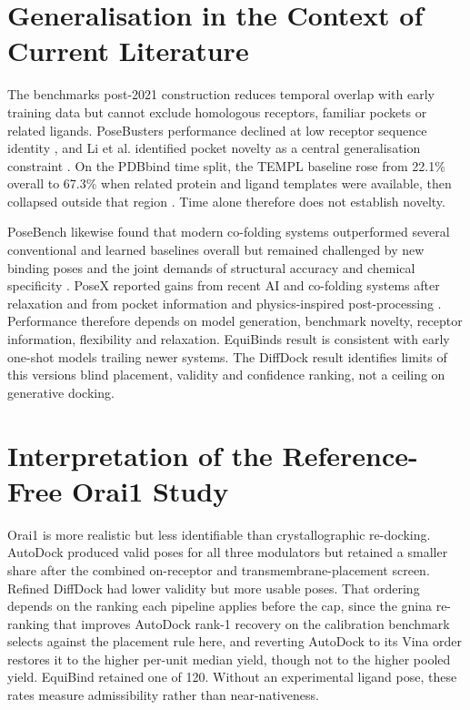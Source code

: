 \hypertarget{generalisation-in-the-context-of-current-literature}{%
\section{Generalisation in the Context of Current Literature}\label{generalisation-in-the-context-of-current-literature}}

The benchmark\textquotesingle s post-2021 construction reduces temporal overlap with early training data but cannot exclude homologous receptors, familiar pockets or related ligands. PoseBusters performance declined at low receptor sequence identity \cite{ref035}, and Li et al. identified pocket novelty as a central generalisation constraint \cite{ref013}. On the PDBbind time split, the TEMPL baseline rose from 22.1\% overall to 67.3\% when related protein and ligand templates were available, then collapsed outside that region \cite{ref065}. Time alone therefore does not establish novelty.

PoseBench likewise found that modern co-folding systems outperformed several conventional and learned baselines overall but remained challenged by new binding poses and the joint demands of structural accuracy and chemical specificity \cite{ref069}. PoseX reported gains from recent AI and co-folding systems after relaxation and from pocket information and physics-inspired post-processing \cite{ref012}. Performance therefore depends on model generation, benchmark novelty, receptor information, flexibility and relaxation. EquiBind\textquotesingle s result is consistent with early one-shot models trailing newer systems. The DiffDock result identifies limits of this version\textquotesingle s blind placement, validity and confidence ranking, not a ceiling on generative docking.

\hypertarget{interpretation-of-the-reference-free-orai1-study}{%
\section{Interpretation of the Reference-Free Orai1 Study}\label{interpretation-of-the-reference-free-orai1-study}}

Orai1 is more realistic but less identifiable than crystallographic re-docking. AutoDock produced valid poses for all three modulators but retained a smaller share after the combined on-receptor and transmembrane-placement screen. Refined DiffDock had lower validity but more usable poses. That ordering depends on the ranking each pipeline applies before the cap, since the gnina re-ranking that improves AutoDock rank-1 recovery on the calibration benchmark selects against the placement rule here, and reverting AutoDock to its Vina order restores it to the higher per-unit median yield, though not to the higher pooled yield. EquiBind retained one of 120. Without an experimental ligand pose, these rates measure admissibility rather than near-nativeness.

